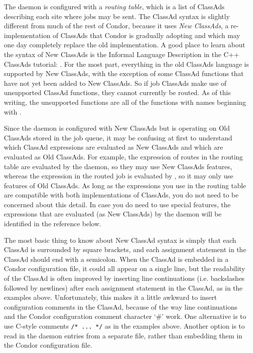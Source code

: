 The  daemon is configured with a \textit{routing table}, which is a list
of ClassAds describing each site where jobs may be sent.  The ClassAd
syntax is slightly different from much of the rest of Condor, because
it uses \emph{New ClassAds}, a re-implementation of ClassAds that
Condor is gradually adopting and which may one day completely replace
the old implementation.  A good place to learn about the syntax of New
ClassAds is the Informal Language Description in the C++ ClassAds
tutorial: .
For the most part, everything in the old ClassAds language is
supported by New ClassAds, with the exception of some ClassAd
functions that have not yet been added to New ClassAds.  So if job
ClassAds make use of unsupported ClassAd functions, they cannot currently be
routed.  As of this writing, the unsupported functions are
all of the functions with names beginning with .

Since the  daemon is configured with New ClassAds but is operating on
Old ClassAds stored in the job queue, it may be confusing at first to
understand which ClassAd expressions are evaluated as New ClassAds and
which are evaluated as Old ClassAds.  For example, the
 expression of routes in the routing table are
evaluated by the  daemon, so they may use New ClassAds features,
whereas the  expression in the routed job is
evaluated by , so it may only use features of Old
ClassAds.  As long as the expressions you use in the routing table are
compatible with both implementations of ClassAds, you do not need to
be concerned about this detail.  In case you do need to use special
features, the expressions that are evaluated (as New ClassAds) by the
 daemon will be identified in the reference below.

The most basic thing to know about New ClassAd syntax is simply that
each ClassAd is surrounded by square brackets, and each assignment
statement in the ClassAd should end with a semicolon.  When the
ClassAd is embedded in a Condor configuration file, it could all
appear on a single line, but the readability of the ClassAd is often
improved by inserting line continuations (i.e. backslashes followed by
newlines) after each assignment statement in the ClassAd, as in the
examples above.  Unfortunately, this makes it a little awkward to
insert configuration comments in the ClassAd, because of the way line
continuations and the Condor configuration comment character `\#' work.
One alternative is to use C-style comments \verb|/* ... */| as in the
examples above.  Another option is to read in the  daemon entries
from a separate file, rather than embedding them in the Condor
configuration file.

